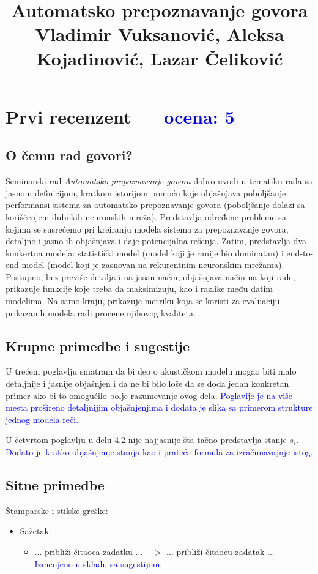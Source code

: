 \documentclass[a4paper]{report}
\newcommand{\odgovor}[1]{\textcolor{blue}{#1}}
\begin{document}
\title{Automatsko prepoznavanje govora\\ \small{Vladimir Vuksanović, Aleksa Kojadinović, Lazar Čeliković}}

\maketitle

\tableofcontents

\chapter{Prvi recenzent \odgovor{--- ocena: 5} }
\section{O čemu rad govori?}
Seminarski rad \emph{Automatsko prepoznavanje govora} dobro uvodi u tematiku rada sa jasnom definicijom, kratkom istorijom pomoću koje objašnjava poboljšanje performansi sistema za automatsko prepoznavanje govora (poboljšanje dolazi sa korišćenjem dubokih neuronskih mreža). Predstavlja određene probleme sa kojima se susrećemo pri kreiranju modela sistema za prepoznavanje govora, detaljno i jasno ih objašnjava i daje potencijalna rešenja. Zatim, predstavlja dva konkertna modela: statistički model (model koji je ranije bio dominatan) i end-to-end model (model koji je zasnovan na rekurentnim neuronskim mrežama). Postupno, bez previše detalja i na jasan način, objašnjava način na koji rade, prikazuje funkcije koje treba da maksimizuju, kao i razlike među datim modelima. Na samo kraju, prikazuje metriku koja se koristi za evaluaciju prikazanih modela radi procene njihovog kvaliteta.

\section{Krupne primedbe i sugestije}
U trećem poglavlju smatram da bi deo o akustičkom modelu mogao biti malo detaljnije i jasnije objašnjen i da ne bi bilo loše da se doda jedan konkretan primer ako bi to omogućilo bolje razumevanje ovog dela.
\odgovor{Poglavlje je na više mesta prošireno detaljnijim objašnjenjima i dodata je slika sa primerom strukture jednog modela reči.}

U četvrtom poglavlju u delu 4.2 nije najjasnije šta tačno predstavlja stanje $s_i$.
\odgovor{Dodato je kratko objašnjenje stanja kao i prateća formula za izračunavajnje istog.}

\section{Sitne primedbe}
Štamparske i stilske greške:
\begin{itemize}
  \item Sažetak:
  \begin{itemize}
  \item ... približi čitaoca zadatku ... $->$ ... približi čitaocu zadatak ...\\ \odgovor{Izmenjeno u skladu sa sugestijom.}
 \end{itemize}
\end{itemize}
\end{document}
